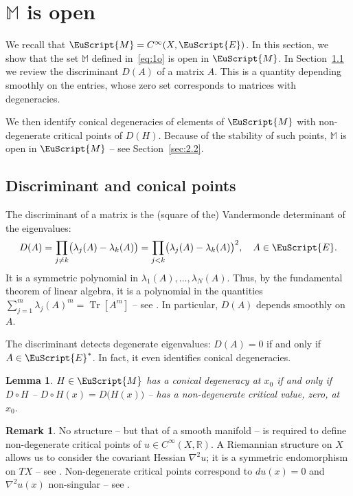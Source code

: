 \documentclass[JEP,XML,SOM,Unicode,NoFloatCountersInSection]{cedram}
\let\pazocal\EuScript
\newtheorem{lem}{Lemma}[section]
\theoremstyle{definition}
\newtheorem{rmk}{Remark}[section]
\DeclareMathOperator{\Tr}{Tr}
\newcommand{\EE}{\pazocal{E}}
\newcommand{\MM}{\pazocal{M}}
\newcommand{\R}{\mathbb{R}}
\newcommand{\Mm}{\mathbb{M}}
\begin{document}
\section{\texorpdfstring{$\Mm$}{M} is open}\label{sec:2}

We recall that $\MM = C^\infty(X,\EE)$. In this section, we show that the set $\Mm$ defined in~\eqref{eq:1o} is open in $\MM$. In Section~\ref{sec:2.1} we review the discriminant $D(A)$ of a matrix $A$. This is a quantity depending smoothly on the entries, whose zero set corresponds to matrices with degeneracies.

We then identify conical degeneracies of elements of $\MM$ with non-degenerate critical points of $D(H)$. Because of the stability of such points, $\Mm$ is open in $\MM$ -- see Section~\ref{sec:2.2}.

\subsection{Discriminant and conical points}\label{sec:2.1} The discriminant of a matrix is the (square of the) Vandermonde determinant of the eigenvalues:
\begin{equation}\label{eq:1h}
D(A) = \prod_{j \neq k} \bigl(\lambda_j(A)-\lambda_k(A)\bigr) = \prod_{j < k} \bigl(\lambda_j(A)-\lambda_k(A)\bigr)^2, \quad A\in \EE.
\end{equation}
It is a symmetric polynomial in $\lambda_1(A), \dots, \lambda_N(A)$. Thus, by the fundamental theorem of linear algebra, it is a polynomial in the quantities $\sum_{j=1}^m \lambda_j(A)^m = \Tr[A^m]$ -- see \eg \cite[\S I.2]{M95}. In particular, $D(A)$ depends smoothly on $A$.

The discriminant detects degenerate eigenvalues: $D(A) = 0$ if and only if $A \in \EE^*$. In fact, it even identifies conical degeneracies.

\begin{lem}\label{lem:1a} $H \in \MM$ has a conical degeneracy at $x_0$ if and only if $D \circ H$ -- \ie $D \circ H(x) = D\bigl( H(x) \bigr)$ -- has a non-degenerate critical value, zero, at $x_0$.
\end{lem}

\begin{rmk}\label{rem:2} No structure -- but that of a smooth manifold -- is required to define non-degenerate critical points of $u \in C^\infty(X,\R)$. A Riemannian structure on $X$ allows us to consider the covariant Hessian $\nabla^2 u$; it is a symmetric endomorphism on $TX$ -- see \eg \cite[\S2.1]{P06}. Non-degenerate critical points correspond to $du(x) = 0$ and $\nabla^2u(x)$ non-singular -- see \eg \cite[\S5.12]{P06}.
\end{rmk}
\end{document}
